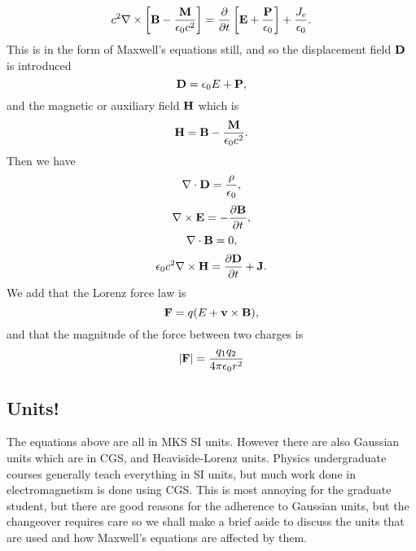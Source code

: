 \documentclass[12pt]{article}
\begin{document}
\begin{equation}
c^2 \nabla \times \left \lbrack
 {\bf B}- \frac{{\bf M}}{\epsilon_0 c^2}
 \right \rbrack
=\frac{\partial }{\partial t} \left  \lbrack {\bf E}+ \frac{{\bf P}}{\epsilon_0} \right \rbrack 
+\frac{J_e}{\epsilon_0}.
\end{equation}
This is in the form of Maxwell's equations still, and so the 
displacement field ${\bf D}$ is introduced
\begin{equation}
{\bf D}= \epsilon_0 E+{\bf P},
\end{equation}
and the magnetic or auxiliary field ${\bf H}$ which is
\begin{equation}
{\bf H}={\bf B}-\frac{{\bf M}}{\epsilon_0 c^2}.
\end{equation}
Then we have
\begin{equation}
 \nabla \cdot {\bf D}=\frac{\rho}{\epsilon_0},
\end{equation}
\begin{equation}
\nabla \times {\bf E}=-\frac{\partial {\bf B}}{\partial t},
\end{equation}
\begin{equation}
 \nabla \cdot {\bf B}=0,
\end{equation}
\begin{equation}
\epsilon_0 c^2 \nabla \times {\bf H}=\frac{\partial {\bf D}}{\partial t} 
+{\bf J}.
\end{equation}
We add that the Lorenz force law is
\begin{equation}
{\bf F}=q ( {\bf} E + {\bf v} \times {\bf B}),
\end{equation}
and that the magnitude of the force between two charges is
\begin{equation}
\vert {\bf F} \vert= \frac{ q_1 q_2}{ 4 \pi \epsilon_0 r^2}
\end{equation}

\subsection{Units!}

The equations above are all in MKS SI units. However there are also 
Gaussian units which are in CGS, and Heaviside-Lorenz units. Physics undergraduate courses generally teach everything in SI units, but much work done in
electromagnetism is done using CGS. This is most annoying for the graduate student, but there are good reasons for the adherence to Gaussian units, but the changeover requires care so we shall make a brief aside to discuss the units that are used and how Maxwell's equations are affected by them.
\end{document}
